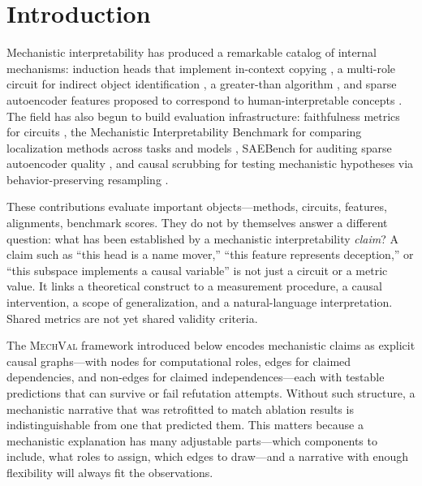 \documentclass[10pt]{article}
\newcommand{\mechval}{\textsc{MechVal}}
\begin{document}
\section{Introduction}
\label{sec:intro}

Mechanistic interpretability has produced a remarkable catalog of internal mechanisms:
induction heads that implement in-context copying \citep{olsson2022context}, a multi-role
circuit for indirect object identification \citep{wang2023interpretability}, a greater-than
algorithm \citep{hanna2023greater}, and sparse autoencoder features proposed to correspond
to human-interpretable concepts \citep{cunningham2023sparse}. The field has also begun to
build evaluation infrastructure: faithfulness metrics for circuits
\citep{miller2024transformer}, the Mechanistic Interpretability Benchmark for comparing
localization methods across tasks and models \citep{mueller2025mib}, SAEBench for auditing
sparse autoencoder quality \citep{karvonen2025saebench}, and causal scrubbing for testing
mechanistic hypotheses via behavior-preserving resampling \citep{chan2022causal}.

These contributions evaluate important objects---methods, circuits, features, alignments,
benchmark scores. They do not by themselves answer a different question: what has been
established by a mechanistic interpretability \emph{claim}? A claim such as ``this head is
a name mover,'' ``this feature represents deception,'' or ``this subspace implements a
causal variable'' is not just a circuit or a metric value. It links a theoretical
construct to a measurement procedure, a causal intervention, a scope of generalization,
and a natural-language interpretation. Shared metrics are not yet shared validity criteria.

The \mechval{} framework introduced below encodes mechanistic claims as explicit causal
graphs---with nodes for computational roles, edges for claimed dependencies, and non-edges
for claimed independences---each with testable predictions that can survive or fail
refutation attempts. Without such structure, a mechanistic narrative that was retrofitted
to match ablation results is indistinguishable from one that predicted them. This matters
because a mechanistic explanation has many adjustable parts---which components to include,
what roles to assign, which edges to draw---and a narrative with enough flexibility will
always fit the observations.
\end{document}
